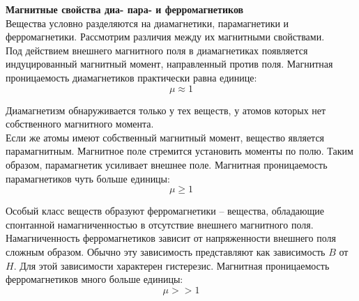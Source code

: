 \documentclass{article}
\begin{document}
	
	\textbf{Магнитные свойства диа- пара- и ферромагнетиков}\\

	Вещества условно разделяются на диамагнетики, парамагнетики и ферромагнетики. Рассмотрим различия между их магнитными свойствами.\\

	Под действием внешнего магнитного поля в диамагнетиках появляется индуцированный магнитный момент, направленный против поля. Магнитная проницаемость диамагнетиков практически равна единице:
	\begin{equation}
		\mu \approx 1
	\end{equation}

	Диамагнетизм обнаруживается только у тех веществ, у атомов которых нет собственного магнитного момента.\\

	Если же атомы имеют собственный магнитный момент, вещество является парамагнитным. Магнитное поле стремится установить моменты по полю. Таким образом, парамагнетик усиливает внешнее поле. Магнитная проницаемость парамагнетиков чуть больше единицы:
	\begin{equation}
		\mu \geq 1
	\end{equation}

	Особый класс веществ образуют ферромагнетики -- вещества, обладающие спонтанной намагниченностью в отсутствие внешнего магнитного поля. Намагниченность ферромагнетиков зависит от напряженности внешнего поля сложным образом. Обычно эту зависимость представляют как зависимость $B$ от $H$. Для этой зависимости характерен гистерезис. Магнитная проницаемость ферромагнетиков много больше единицы:
	\begin{equation}
		\mu >> 1
	\end{equation}
\end{document}
